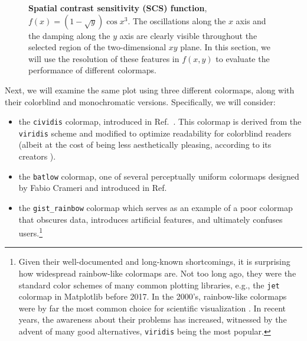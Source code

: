 \begin{figure}
\captionsetup{format = sidebyside, indention = 0cm} 
\begin{minipage}[t]{0.4\textwidth}
	\vspace{-5pt}
	\caption{\textbf{Spatial contrast sensitivity (SCS) function},  $f(x)= \left(1 - \sqrt{y} \right)  \cos x^3$. The oscillations along the $x$ axis and the damping along the $y$ axis are clearly visible throughout the selected region of the two-dimensional $xy$ plane. In this section, we will use the resolution of these features in $f(x,y)$ to evaluate the performance of different colormaps.}
	\label{fig:sensitivityfunction}
\end{minipage}\hfill 
\begin{minipage}[t]{0.55\textwidth}
	\centering 
	\vspace{0pt}
	
\end{minipage}
\end{figure} 

Next, we will examine the same plot using three different colormaps, along with their colorblind and monochromatic versions. Specifically, we will consider:
\begin{itemize}
\item the \verb|cividis| colormap, introduced in Ref.~\cite{nunez2018}. This colormap is derived from the \verb|viridis| scheme and modified to optimize readability for colorblind readers (albeit at the cost of being less aesthetically pleasing, according to its creators \cite{nunez2018}).
\item the \verb|batlow| colormap, one of several perceptually uniform colormaps designed by Fabio Crameri and introduced in Ref.~\cite{crameri2020}
\item the \verb|gist_rainbow| colormap  which serves as an example of a poor colormap that obscures data, introduces artificial features, and ultimately confuses users.\footnote{Given their well-documented and long-known shortcomings, it is surprising how widespread rainbow-like colormaps are. Not too long ago, they were the standard color schemes of many common plotting libraries, e.g., the \texttt{jet} colormap in Matplotlib before 2017. In the 2000's, rainbow-like colormaps were by far the most common choice for scientific visualization \cite{borland2007}.
In recent years, the awareness about their problems has increased, witnessed by the advent of many good alternatives, \texttt{viridis} being the most popular.}
\end{itemize}

